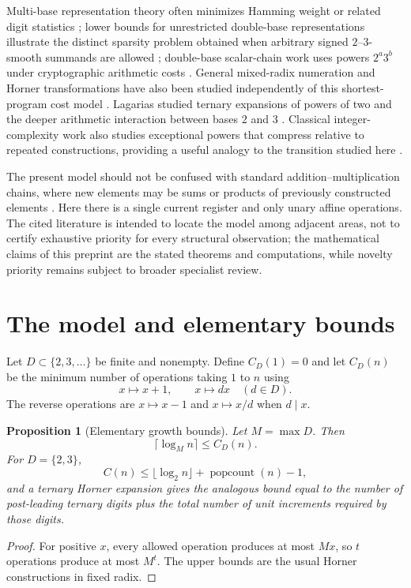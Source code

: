 \documentclass[11pt]{article}
\newtheorem{proposition}[theorem]{Proposition}
\begin{document}
Multi-base representation theory often minimizes Hamming weight or related digit statistics \cite{KrennSuppakitpaisarnWagner2020}; lower bounds for unrestricted double-base representations illustrate the distinct sparsity problem obtained when arbitrary signed $2$--$3$-smooth summands are allowed \cite{DimitrovHowe2010}; double-base scalar-chain work uses powers $2^a3^b$ under cryptographic arithmetic costs \cite{BernsteinChuengsatiansupLange2017}. General mixed-radix numeration and Horner transformations have also been studied independently of this shortest-program cost model \cite{Simon2025}. Lagarias studied ternary expansions of powers of two and the deeper arithmetic interaction between bases $2$ and $3$ \cite{Lagarias2009}. Classical integer-complexity work also studies exceptional powers that compress relative to repeated constructions, providing a useful analogy to the transition studied here \cite{CernenoksEtAl2014}.

The present model should not be confused with standard addition--multiplication chains, where new elements may be sums or products of previously constructed elements \cite{Bahig2008,TarekBahigAnwar2026}. Here there is a single current register and only unary affine operations. The cited literature is intended to locate the model among adjacent areas, not to certify exhaustive priority for every structural observation; the mathematical claims of this preprint are the stated theorems and computations, while novelty priority remains subject to broader specialist review.

\section{The model and elementary bounds}
Let $D\subset\{2,3,\dots\}$ be finite and nonempty. Define $C_D(1)=0$ and let $C_D(n)$ be the minimum number of operations taking $1$ to $n$ using
\[
 x\mapsto x+1,\qquad x\mapsto dx\quad(d\in D).
\]
The reverse operations are $x\mapsto x-1$ and $x\mapsto x/d$ when $d\mid x$.

\begin{proposition}[Elementary growth bounds]\label{prop:bounds}
Let $M=\max D$. Then
\[
 \lceil\log_M n\rceil\le C_D(n).
\]
For $D=\{2,3\}$,
\[
 C(n)\le \lfloor\log_2n\rfloor+\operatorname{popcount}(n)-1,
\]
and a ternary Horner expansion gives the analogous bound equal to the number of post-leading ternary digits plus the total number of unit increments required by those digits.
\end{proposition}
\begin{proof}
For positive $x$, every allowed operation produces at most $Mx$, so $t$ operations produce at most $M^t$. The upper bounds are the usual Horner constructions in fixed radix.
\end{proof}
\end{document}
